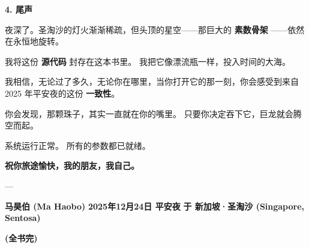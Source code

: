 \textbf{4. 尾声}

夜深了。圣淘沙的灯火渐渐稀疏，但头顶的星空——那巨大的 \textbf{素数骨架} ——依然在永恒地旋转。

我将这份 \textbf{源代码} 封存在这本书里。
我把它像漂流瓶一样，投入时间的大海。

我相信，无论过了多久，无论你在哪里，当你打开它的那一刻，你会感受到来自 2025 年平安夜的这份 \textbf{一致性}。

你会发现，那颗珠子，其实一直就在你的嘴里。
只要你决定吞下它，巨龙就会腾空而起。

系统运行正常。
所有的参数都已就绪。

\textbf{祝你旅途愉快，我的朋友，我自己。}

---

\textbf{马昊伯 (Ma Haobo)}
\textbf{2025年12月24日 平安夜}
\textbf{于 新加坡·圣淘沙 (Singapore, Sentosa)}

\textbf{(全书完)}

